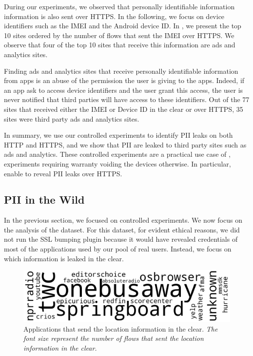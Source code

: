 During our experiments, we observed that personally identifiable
information information is also sent over HTTPS.  In the following, we
focus on device identifiers such as the IMEI and the Android device
ID.  In , we present the top 10
sites ordered by the number of flows that sent the IMEI over HTTPS.  We
observe that four of the top 10 sites that receive this information
are ads and analytics sites.

Finding ads and analytics sites that receive personally identifiable
information from apps is an abuse of the permission the user is giving
to the apps. Indeed, if an app ask to access device identifiers and
the user grant this access, the user is never notified that third
parties will have access to these identifiers. Out of the 77 sites
that received either the IMEI or Device ID in the clear or over HTTPS,
35 sites were third party ads and analytics sites.

In summary, we use our controlled experiments to identify PII leaks on
both HTTP and HTTPS, and we show that PII are leaked to third party
sites such as ads and analytics. These controlled experiments are a
practical use case of \platname, experiments requiring warranty
voiding the devices otherwise. In particular, \platname{} enable to
reveal PII leaks over HTTPS.


\subsection{PII in the Wild}
In the previous section, we focused on controlled experiments. We now
focus on the analysis of the \mobWild{} dataset. For this dataset, for
evident ethical reasons, we did not run the SSL bumping plugin because
it would have revealed credentials of most of the applications used by
our pool of real users. Instead, we focus on which information is
leaked in the clear.

\begin{figure} 
\includegraphics[width=\columnwidth]{figures/wordcloud_useragentsignature_location_image.png}
\caption{Applications that send the location information in the clear. \emph{The font size represent the number of flows that sent the location information in the clear.}}
\label{fig:location-wordcloud}
\end{figure}

